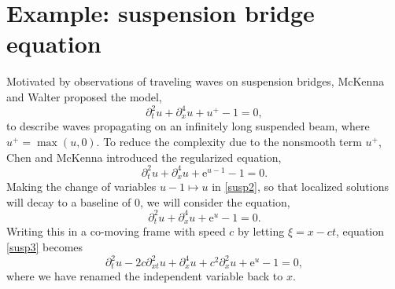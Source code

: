 \documentclass[review,onefignum,onetabnum]{siamart171218}
\newcommand{\rme}{\mathrm{e}}
\newcommand{\rmn}{\mathrm{n}}
\newcommand{\calA}{\mathcal{A}}
\newcommand{\calL}{\mathcal{L}}
\newcommand{\calO}{\mathcal{O}}
\begin{document}
%

\section{Example: suspension bridge equation}\label{s:6}

Motivated by observations of traveling waves on suspension bridges, McKenna and Walter \cite{McKenna1990} proposed the model,
\begin{equation}\label{susp}
\partial_t^2u + \partial_x^4u + u^+ - 1 = 0,
\end{equation}
to describe waves propagating on an infinitely long suspended beam, where $u^+ = \max(u, 0)$. To reduce the complexity due to the nonsmooth term $u^+$, Chen and McKenna \cite{Chen1997} introduced the regularized equation,
\begin{equation}\label{susp2}
\partial_t^2u + \partial_x^4u + \rme^{u-1} - 1 = 0.
\end{equation}
Making the change of variables $u - 1 \mapsto u$ in \cref{susp2}, so that localized solutions will decay to a baseline of 0, we will consider the equation,
\begin{equation}\label{susp3}
\partial_t^2u + \partial_x^4u +  \rme^{u} - 1 = 0.
\end{equation}
Writing this in a co-moving frame with speed $c$ by letting $\xi = x - ct$, equation \cref{susp3} becomes
\begin{equation}\label{suspc}
\partial_t^2u - 2 c\partial_{xt}^2u +\partial_x^4u +  c^2\partial_x^2u + \rme^{u} - 1 = 0,
\end{equation}
where we have renamed the independent variable back to $x$.
\end{document}
